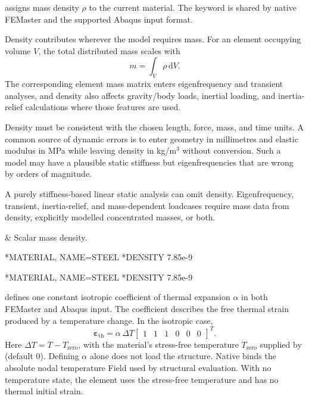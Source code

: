  assigns mass density \(\rho\) to the current material. The keyword is shared by native FEMaster and the supported Abaqus input format.

Density contributes wherever the model requires mass. For an element occupying volume \(V\), the total distributed mass scales with
\[
m=\int_V \rho\,\mathrm dV.
\]
The corresponding element mass matrix enters eigenfrequency and transient analyses, and density also affects gravity/body loads, inertial loading, and inertia-relief calculations where those features are used.

Density must be consistent with the chosen length, force, mass, and time units. A common source of dynamic errors is to enter geometry in millimetres and elastic modulus in MPa while leaving density in kg/m\(^3\) without conversion. Such a model may have a plausible static stiffness but eigenfrequencies that are wrong by orders of magnitude.

A purely stiffness-based linear static analysis can omit density. Eigenfrequency, transient, inertia-relief, and mass-dependent loadcases require mass data from density, explicitly modelled concentrated masses, or both.

\begin{keyworddata}
 & Scalar mass density. \\
\end{keyworddata}

\exampleheading

\begin{dialectexamples}
\begin{femasterdeck}
*MATERIAL, NAME=STEEL
*DENSITY
7.85e-9
\end{femasterdeck}
\begin{abaqusdeck}
*MATERIAL, NAME=STEEL
*DENSITY
7.85e-9
\end{abaqusdeck}
\end{dialectexamples}


 defines one constant isotropic coefficient of thermal expansion \(\alpha\) in both FEMaster and Abaqus input. The coefficient describes the free thermal strain produced by a temperature change. In the isotropic case,
\[
\boldsymbol\varepsilon_{\mathrm{th}}
=\alpha\,\Delta T
\begin{bmatrix}1&1&1&0&0&0\end{bmatrix}^{T}.
\]
Here \(\Delta T=T-T_{\mathrm{zero}}\), with the material's stress-free temperature \(T_{\mathrm{zero}}\) supplied by  (default 0). Defining \(\alpha\) alone does not load the structure. Native  binds the absolute nodal temperature Field used by structural evaluation. With no temperature state, the element uses the stress-free temperature and has no thermal initial strain.


